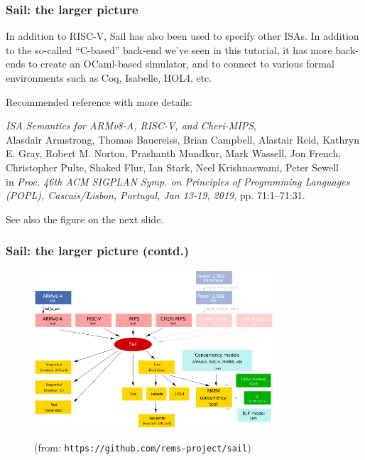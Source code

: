 \documentclass[aspectratio=169]{beamer}
\newcommand{\slidefont}{\scriptsize}
\begin{document}

\begin{frame}[fragile]
  \frametitle{Sail: the larger picture}

  \slidefont

  In addition to RISC-V, Sail has also been used to specify other
  ISAs.  In addition to the so-called ``C-based'' back-end we've seen
  in this tutorial, it has more back-ends to create an OCaml-based
  simulator, and to connect to various formal environments such as
  Coq, Isabelle, HOL4, etc.

  \vspace{2ex}

  Recommended reference with more details:
  
  \vspace{2ex}

  \hfill \begin{minipage}{0.95\textwidth}
    \emph{ISA Semantics for ARMv8-A, RISC-V, and Cheri-MIPS}, \\
    Alasdair Armstrong,
    Thomas Bauereiss,
    Brian Campbell,
    Alastair Reid,
    Kathryn E. Gray,
    Robert M. Norton,
    Prashanth Mundkur,
    Mark Wassell,
    Jon French,
    Christopher Pulte,
    Shaked Flur,
    Ian Stark,
    Neel Krishnaswami,
    Peter Sewell \\
    in \emph{Proc. 46th ACM SIGPLAN Symp. on Principles of Programming
    Languages (POPL), Cascais/Lisbon, Portugal, Jan 13-19, 2019},
    pp. 71:1--71:31.
  \end{minipage}

  \vspace{2ex}

  See also the figure on the next slide.
\end{frame}


\begin{frame}[fragile]
  \frametitle{Sail: the larger picture (contd.)}

  \begin{figure}[htbp]
    \centerline{\includegraphics[height=2.3in]{Figures/overview-sail.png}}
    {\scriptsize (from: {\tt https://github.com/rems-project/sail})}
  \end{figure}

\end{frame}
\end{document}
